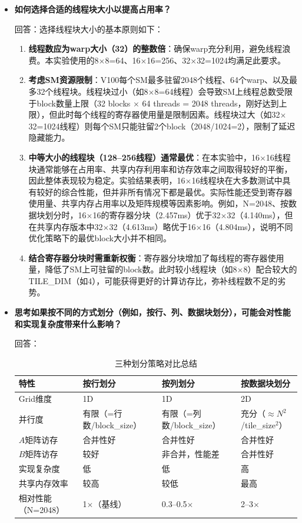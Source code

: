 \documentclass{SYSUReport}
\begin{document}
\begin{itemize}
    \item \textbf{如何选择合适的线程块大小以提高占用率？}\par
    回答：选择线程块大小的基本原则如下：
    \begin{enumerate}
        \item \textbf{线程数应为warp大小（32）的整数倍}：确保warp充分利用，避免线程浪费。本实验使用的8$\times$8=64、16$\times$16=256、32$\times$32=1024均满足此要求。
        \item \textbf{考虑SM资源限制}：V100每个SM最多驻留2048个线程、64个warp、以及最多32个线程块。线程块过小（如8$\times$8=64线程）会导致SM上线程总数受限于block数量上限（32 blocks $\times$ 64 threads = 2048 threads，刚好达到上限），但此时每个线程的寄存器使用量是限制因素。线程块过大（如32$\times$32=1024线程）则每个SM只能驻留2个block（2048/1024=2），限制了延迟隐藏能力。
        \item \textbf{中等大小的线程块（128--256线程）通常最优}：在本实验中，16$\times$16线程块通常能够在占用率、共享内存利用率和访存效率之间取得较好的平衡，因此整体表现较为稳定。实验结果表明，16$\times$16线程块在大多数测试中具有较好的综合性能，但并非所有情况下都是最优。实际性能还受到寄存器使用量、共享内存占用率以及矩阵规模等因素影响。例如，N=2048、按数据块划分时，16$\times$16的寄存器分块（2.457ms）优于32$\times$32（4.140ms），但在共享内存版本中32$\times$32（4.613ms）略优于16$\times$16（4.804ms），说明不同优化策略下的最优block大小并不相同。
        \item \textbf{结合寄存器分块时需重新权衡}：寄存器分块增加了每线程的寄存器使用量，降低了SM上可驻留的block数。此时较小线程块（如8$\times$8）配合较大的TILE\_DIM（如4），可能获得更好的计算访存比，弥补线程数不足的劣势。
    \end{enumerate}

    \item \textbf{思考如果按不同的方式划分（例如，按行、列、数据块划分），可能会对性能和实现复杂度带来什么影响？}\par
    回答：

\begin{table}[H]
\centering
\caption{三种划分策略对比总结}
\label{tab:comparison}
\begin{tabularx}{\textwidth}{|l|X|X|X|}
\hline
特性 & 按行划分 & 按列划分 & 按数据块划分 \\
\hline
Grid维度 & 1D & 1D & 2D \\
\hline
并行度 & 有限（=行数/block\_size） & 有限（=列数/block\_size） & 充分（$\approx N^2$/tile\_size$^2$） \\
\hline
$A$矩阵访存 & 合并性好 & 合并性好 & 合并性好 \\
\hline
$B$矩阵访存 & 较好 & 非合并，性能差 & 合并性好 \\
\hline
实现复杂度 & 低 & 低 & 高 \\
\hline
共享内存效率 & 较高 & 较低 & 最高 \\
\hline
相对性能（N=2048） & 1$\times$（基线） & 0.3--0.5$\times$ & 2--3$\times$ \\
\hline
\end{tabularx}
\end{table}


\end{itemize}
\end{document}
